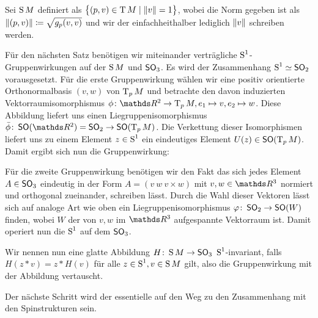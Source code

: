 Sei $\S M$ definiert als $\set{(p,v) \in \TT M}{ \norm{v} = 1}$, wobei
die Norm gegeben ist als $ \norm{(p,v)} \coloneqq \sqrt{g_p(v,v)} $
und wir der einfachheithalber lediglich $ \norm{v} $ schreiben werden.

Für den nächsten Satz benötigen wir miteinander verträgliche $ \S^1 $-Gruppenwirkungen auf der $ \S M $ und $ \so_3 $. Es wird der
Zusammenhang $ \S^1 \simeq \so_2 $ vorausgesetzt. Für die erste
Gruppenwirkung wählen wir eine positiv orientierte Orthonormalbasis
$ (v,w) $ von $ \tang{p}{M} $ und betrachte den davon induzierten
Vektorraumisomorphismus $ \abb{\phi}{\R^2}{\tang{p}{M}},e_1 \mapsto v, e_2\mapsto w $. Diese
Abbildung liefert uns einen Liegruppenisomorphismus $\abb{\bar{\phi}}{\so(\R^2) = \so_2}{\so(\tang{p}{M})} $. Die Verkettung
dieser Isomorphismen liefert uns zu einem Element $ z\in\S^1 $ ein
eindeutiges Element $ U(z)\in \so(\tang{p}{M}) $. Damit ergibt sich
nun die Gruppenwirkung:

Für die zweite Gruppenwirkung benötigen wir den Fakt das sich jedes
Element $ A \in \so_3$  eindeutig in der Form $ A=\left( v~w~v\times w\right) $ mit $ v,w \in \R^3$ normiert und orthogonal zueinander, 
schreiben lässt. Durch die Wahl dieser Vektoren lässt sich auf
analoge Art wie oben ein Liegruppenisomorphismus $ \abb{\varphi}{\so_2}{\so(W)} $ finden, wobei $ W $ der von $ v,w $ 
im $ \R^3 $ aufgespannte Vektorraum ist. Damit operiert nun die
$ \S^1 $ auf dem $ \so_3 $.

Wir nennen nun eine glatte Abbildung $ \abb{H}{\S M}{\so_3}~\S^1$-invariant, falls $ H(z*v) = z*H(v) $ für alle $ z \in \S^1, v\in \S M $ gilt, also die Gruppenwirkung mit der Abbildung vertauscht. 
 

Der nächste Schritt wird der essentielle auf den Weg zu den
Zusammenhang mit den Spinstrukturen sein.

